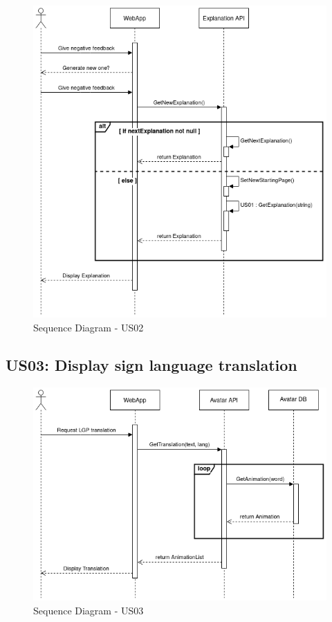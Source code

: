 \begin{figure}[H]
\centering
\includegraphics[scale=0.45]{ch4/assets/US02_SD.png}
\caption[Sequence Diagram US02]{Sequence Diagram - US02}
\label{fig:sdus02}
\end{figure}

\subsection{US03: Display sign language translation}

\begin{figure}[H]
\centering
\includegraphics[scale=0.45]{ch4/assets/US03_SD.png}
\caption[Sequence Diagram US03]{Sequence Diagram - US03}
\label{fig:sdus03}
\end{figure}

